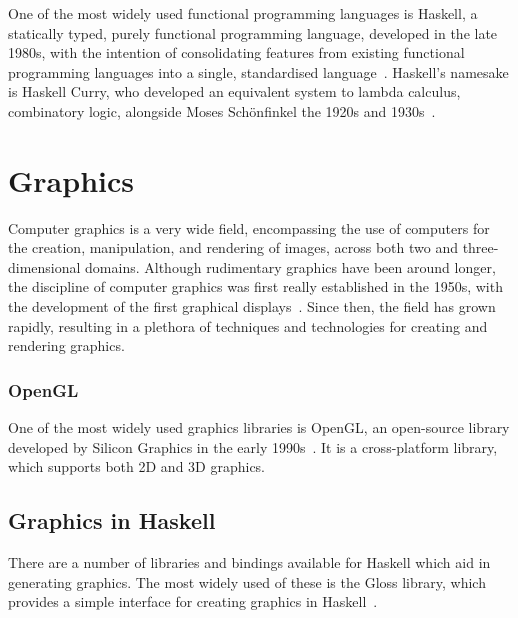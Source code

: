 \documentclass[../main.tex]{subfiles}
\begin{document}
        One of the most widely used functional programming languages is Haskell, a
            statically typed, purely functional programming language, developed in the late
            1980s, with the intention of consolidating features from existing functional
            programming languages into a single, standardised
            language~\citep{haskellConference}.
        Haskell's namesake is Haskell Curry, who developed an equivalent system to
            lambda calculus, combinatory logic, alongside Moses Schönfinkel the 1920s and
            1930s~\citep{combinatoryLogic}.

    \section{Graphics}
        Computer graphics is a very wide field, encompassing the use of computers for
            the creation, manipulation, and rendering of images, across both two and
            three-dimensional domains.
        Although rudimentary graphics have been around longer, the discipline of
            computer graphics was first really established in the 1950s, with the
            development of the first graphical displays~\citep{X}.
        Since then, the field has grown rapidly, resulting in a plethora of techniques
            and technologies for creating and rendering graphics.

        \subsubsection{OpenGL}
            One of the most widely used graphics libraries is OpenGL, an open-source
                library developed by Silicon Graphics in the early 1990s~\citep{X}.
            It is a cross-platform library, which supports both 2D and 3D graphics.

        \subsection{Graphics in Haskell}
            There are a number of libraries and bindings available for Haskell which aid in
                generating graphics.
            The most widely used of these is the Gloss library, which provides a simple
                interface for creating graphics in Haskell~\citep{X}.
\end{document}
